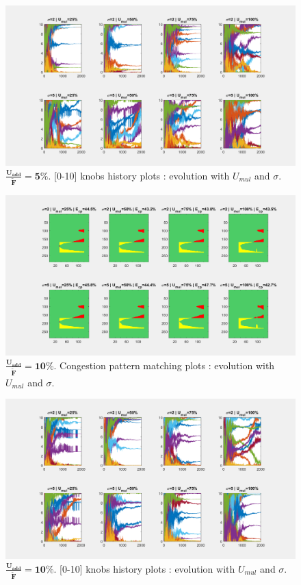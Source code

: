 \begin{figure}[h]
	\label{fig:uaddknobs5}
	\caption{$\mathbf{\frac{U_{add}}{\widetilde{F}}=5\%}$. [0-10] knobs history plots : evolution with $U_{mul}$ and $\sigma$.}
	\includegraphics[width=7in]{figures/results_figures/Uadd/knobs_Uadd_5_lambda_11.png}
\end{figure}
\begin{figure}[h]
	\label{fig:uaddcp10}
	\caption{$\mathbf{\frac{U_{add}}{\widetilde{F}}=10\%}$. Congestion pattern matching plots : evolution with $U_{mul}$ and $\sigma$.}
	\includegraphics[width=7in]{figures/results_figures/Uadd/cp_Uadd_10_lambda_11.png}
\end{figure}	
\begin{figure}[h]
	\label{fig:uaddknobs10}
	\caption{$\mathbf{\frac{U_{add}}{\widetilde{F}}=10\%}$. [0-10] knobs history plots : evolution with $U_{mul}$ and $\sigma$.}
	\includegraphics[width=7in]{figures/results_figures/Uadd/knobs_Uadd_10_lambda_11.png}
\end{figure}
